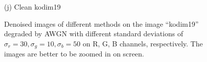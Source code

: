 \documentclass[10pt,onecolumn,letterpaper]{article}
\begin{document}
\begin{figure}
{\begin{minipage}[t]{0.195\textwidth}
{\footnotesize (j) Clean kodim19}
\end{minipage}
}
\caption{Denoised images of different methods on the image ``kodim19'' degraded by AWGN with different standard deviations of $\sigma_{r}=30, \sigma_{g}=10, \sigma_{b}=50$ on R, G, B channels, respectively. The images are better to be zoomed in on screen.}
\label{f1}
\vspace{2mm}
\end{figure}

\end{document}
